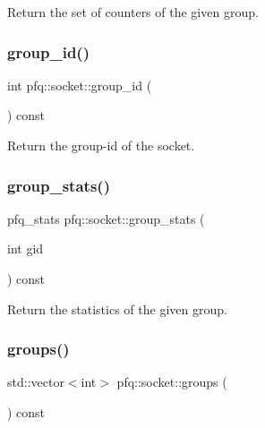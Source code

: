 Return the set of counters of the given group. 

\mbox{\label{classpfq_1_1socket_a469d06a58cfbe1a24893ce619218d536}} 
\subsubsection{\texorpdfstring{group\+\_\+id()}{group\_id()}}
{\footnotesize\ttfamily int pfq\+::socket\+::group\+\_\+id (\begin{DoxyParamCaption}{ }\end{DoxyParamCaption}) const\hspace{0.3cm}{\ttfamily [inline]}}



Return the group-\/id of the socket. 

\mbox{\label{classpfq_1_1socket_aba2cd658b52f9c00b163deb891983709}} 
\subsubsection{\texorpdfstring{group\+\_\+stats()}{group\_stats()}}
{\footnotesize\ttfamily pfq\+\_\+stats pfq\+::socket\+::group\+\_\+stats (\begin{DoxyParamCaption}\item[{int}]{gid }\end{DoxyParamCaption}) const\hspace{0.3cm}{\ttfamily [inline]}}



Return the statistics of the given group. 

\mbox{\label{classpfq_1_1socket_a6b850a0f5acec17e153c16cdfca16d52}} 
\subsubsection{\texorpdfstring{groups()}{groups()}}
{\footnotesize\ttfamily std\+::vector$<$int$>$ pfq\+::socket\+::groups (\begin{DoxyParamCaption}{ }\end{DoxyParamCaption}) const\hspace{0.3cm}{\ttfamily [inline]}}



